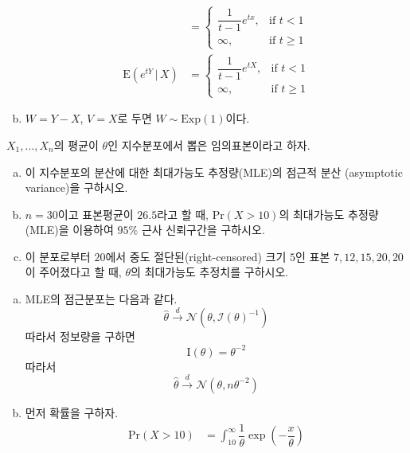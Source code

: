 \documentclass[answers]{exam}
\begin{document}
\begin{questions}
\begin{solution}
\begin{enumerate}[(a)]
\begin{align}
        &=\begin{cases}\dfrac{1}{t-1}e^{tx}, & \text{if $t<1$}\\ \infty,&\text{if $t\geq 1$} \end{cases}\\
        \mathrm{E}\left(e^{tY}\,|\,X\right)&=\begin{cases}\dfrac{1}{t-1}e^{tX}, & \text{if $t<1$}\\ \infty,&\text{if $t\geq 1$} \end{cases}
      \end{align}
      \item $W=Y-X$, $V=X$로 두면 $W\sim \mathrm{Exp}\left(1\right)$이다.
    \end{enumerate}
   \end{solution}
   \question
   $X_{1},\ldots,X_{n}$의 평균이 $\theta$인 지수분포에서 뽑은 임의표본이라고 하자.
   \begin{enumerate}[(a)]
    \item 이 지수분포의 분산에 대한 최대가능도 추정량(MLE)의 점근적 분산 (asymptotic variance)을 구하시오.
    \item $n=30$이고 표본평균이 $26.5$라고 할 때, $\mathrm{Pr}\left(X>10\right)$의 최대가능도 추정량(MLE)을 이용하여 $95\%$ 근사 신뢰구간을 구하시오.
    \item 이 분포로부터 $20$에서 중도 절단된(right-censored) 크기 $5$인 표본 $7,12,15,20,20$이 주어졌다고 할 때, $\theta$의 최대가능도 추정치를 구하시오.
   \end{enumerate}
   \begin{solution}
    \begin{enumerate}[(a)]
      \item MLE의 점근분포는 다음과 같다.
      \begin{equation}
        \widehat{\theta} \xrightarrow{d}\mathcal{N}\left(\theta,\mathcal{I}\left(\theta\right)^{-1}\right)
      \end{equation}
      따라서 정보량을 구하면
      \begin{equation}
        \mathrm{I}\left(\theta\right) = \theta^{-2}
      \end{equation}
      따라서
      \begin{equation}
        \widehat{\theta}\xrightarrow{d}\mathcal{N}\left(\theta,n\theta^{-2}\right)
      \end{equation}
      \item 먼저 확률을 구하자.
      \begin{align}
        \mathrm{Pr}\left(X>10\right) &= \int_{10}^{\infty}\dfrac{1}{\theta}\exp\left(-\dfrac{x}{\theta}\right)\\

\end{align}
\end{enumerate}
\end{solution}
\end{questions}
\end{document}
